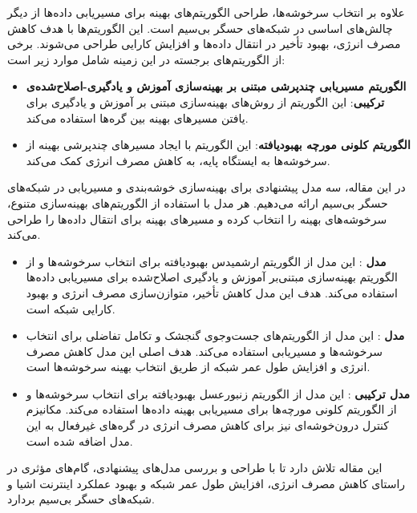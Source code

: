 \documentclass[11.5pt, onecolumn, a4paper]{article}
\begin{document}
علاوه بر انتخاب سرخوشه‌ها، طراحی الگوریتم‌های بهینه برای مسیریابی داده‌ها از دیگر چالش‌های اساسی در شبکه‌های حسگر بی‌سیم است. این الگوریتم‌ها با هدف کاهش مصرف انرژی، بهبود تأخیر در انتقال داده‌ها و افزایش کارایی طراحی می‌شوند. برخی از الگوریتم‌های برجسته در این زمینه شامل موارد زیر است:

\begin{itemize}
	\item \textbf{الگوریتم مسیریابی چندپرشی مبتنی بر بهینه‌سازی آموزش و یادگیری-اصلاح‌شده‌ی ترکیبی}: این الگوریتم از روش‌های بهینه‌سازی مبتنی بر آموزش و یادگیری برای یافتن مسیرهای بهینه بین گره‌ها استفاده می‌کند.
	\item \textbf{الگوریتم کلونی مورچه بهبودیافته}: این الگوریتم با ایجاد مسیرهای چندپرشی بهینه از سرخوشه‌ها به ایستگاه پایه، به کاهش مصرف انرژی کمک می‌کند.
\end{itemize}


در این مقاله، سه مدل پیشنهادی برای بهینه‌سازی خوشه‌بندی و مسیریابی در شبکه‌های حسگر بی‌سیم ارائه می‌دهیم. هر مدل با استفاده از الگوریتم‌های بهینه‌سازی متنوع، سرخوشه‌های بهینه را انتخاب کرده و مسیرهای بهینه برای انتقال داده‌ها را طراحی می‌کند.

\begin{itemize}
	\item \textbf{مدل } \cite{ref4}: این مدل از الگوریتم ارشمیدس بهبودیافته برای انتخاب سرخوشه‌ها و از الگوریتم بهینه‌سازی مبتنی‌بر آموزش و یادگیری اصلاح‌شده برای مسیریابی داده‌ها استفاده می‌کند. هدف این مدل کاهش تأخیر، متوازن‌سازی مصرف انرژی و بهبود کارایی شبکه است.
	\item \textbf{مدل } \cite{ref5}: این مدل از الگوریتم‌های جست‌وجوی گنجشک و تکامل تفاضلی برای انتخاب سرخوشه‌ها و مسیریابی استفاده می‌کند. هدف اصلی این مدل کاهش مصرف انرژی و افزایش طول عمر شبکه از طریق انتخاب بهینه سرخوشه‌ها است.
	\item \textbf{مدل ترکیبی } \cite{ref6}: این مدل از الگوریتم زنبورعسل بهبودیافته برای انتخاب سرخوشه‌ها و از الگوریتم کلونی مورچه‌ها برای مسیریابی بهینه داده‌ها استفاده می‌کند. مکانیزم کنترل درون‌خوشه‌ای نیز برای کاهش مصرف انرژی در گره‌های غیرفعال به این مدل اضافه شده است.
\end{itemize}

این مقاله تلاش دارد تا با طراحی و بررسی مدل‌های پیشنهادی، گام‌های مؤثری در راستای کاهش مصرف انرژی، افزایش طول عمر شبکه و بهبود عملکرد اینترنت اشیا و شبکه‌های حسگر بی‌سیم بردارد.
\end{document}
